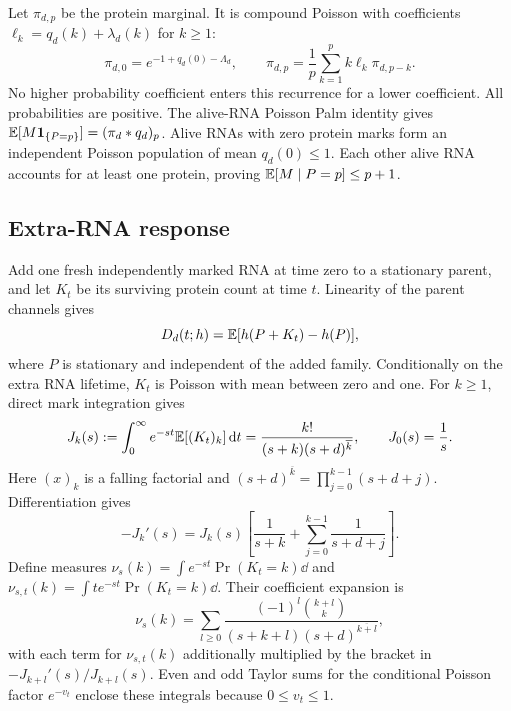 Let $\pi_{d,p}$ be the protein marginal. It is compound Poisson with
coefficients $\ell_k=q_d(k)+\lambda_d(k)$ for $k\geq1$:
\begin{equation}
 \pi_{d,0}=e^{-1+q_d(0)-\Lambda_d},\qquad
 \pi_{d,p}=\frac1p\sum_{k=1}^p k\ell_k\pi_{d,p-k}.
 \label{eq:marginal}
\end{equation}
No higher probability coefficient enters this recurrence for a lower
coefficient. All probabilities are positive. The alive-RNA Poisson
Palm identity gives $\mathbb E[M\mathbf 1_{\{P=p\}}]=(\pi_d*q_d)_p$.
Alive RNAs with zero protein marks form an independent Poisson
population of mean $q_d(0)\leq1$. Each other alive RNA accounts for at
least one protein, proving $\mathbb E[M\mid P=p]\leq p+1$.

\subsection{Extra-RNA response}

Add one fresh independently marked RNA at time zero to a stationary
parent, and let $K_t$ be its surviving protein count at time $t$. Linearity
of the parent channels gives
\begin{equation}
 D_d(t;h)=\mathbb E[h(P+K_t)-h(P)],
\end{equation}
where $P$ is stationary and independent of the added family.
Conditionally on the extra RNA lifetime, $K_t$ is Poisson with mean
between zero and one. For $k\geq1$, direct mark integration gives
\begin{equation}
 J_k(s):=\int_0^\infty e^{-st}\mathbb E[(K_t)_k]\,\mathrm dt
 =\frac{k!}{(s+k)(s+d)^{\overline k}},\qquad J_0(s)=\frac1s.
\end{equation}
Here $(x)_k$ is a falling factorial and
$(s+d)^{\overline k}=\prod_{j=0}^{k-1}(s+d+j)$.
Differentiation gives
\begin{equation}
 -J_k'(s)=J_k(s)
 \left[\frac1{s+k}+\sum_{j=0}^{k-1}\frac1{s+d+j}\right].
\end{equation}
Define measures
$\nu_s(k)=\int e^{-st}\Pr(K_t=k)\dd$ and
$\nu_{s,t}(k)=\int te^{-st}\Pr(K_t=k)\dd$.
Their coefficient expansion is
\begin{equation}
 \nu_s(k)=\sum_{l\geq0}
 \frac{(-1)^l\binom{k+l}{k}}
 {(s+k+l)(s+d)^{\overline{k+l}}},
 \label{eq:nu}
\end{equation}
with each term for $\nu_{s,t}(k)$ additionally multiplied by the bracket
in $-J_{k+l}'(s)/J_{k+l}(s)$. Even and odd Taylor sums for the
conditional Poisson factor $e^{-v_t}$ enclose these integrals because
$0\leq v_t\leq1$.

